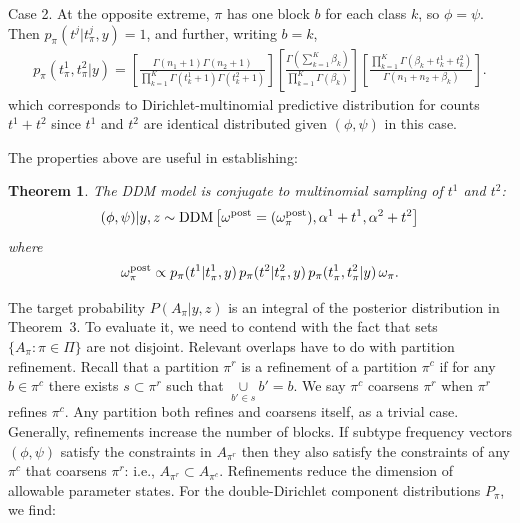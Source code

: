 \documentclass[aoas,preprint]{imsart}
\newtheorem{theorem}{Theorem}
\begin{document}
Case 2. At the opposite extreme, $\pi$  has one block $b$ for each
 class $k$, so $\phi=\psi$. Then $p_\pi(t^j | t^j_{\pi},y) = 1$, and 
further, writing $b = k$,
\begin{eqnarray*}
p_\pi(t^1_{\pi},t^2_{\pi}|y ) =
 \left[ \frac{ \Gamma(n_1+1) \Gamma(n_2+1) }{ \prod_{k=1}^K 
   \Gamma(t^1_k+1) 
   \Gamma( t^2_k + 1 )} \right] 
\left[ \frac{\Gamma( \sum_{k=1}^K \beta_k  )}{
   \prod_{k=1}^K \Gamma(\beta_k)} \right] 
 \left[ \frac{ \prod_{k=1}^K \Gamma( \beta_k + t^1_k + t^2_k )}{
	\Gamma( n_1 + n_2 + \beta_k  )} \right].
\end{eqnarray*}
which corresponds to Dirichlet-multinomial predictive distribution for counts $t^1 + t^2$ 
since $t^1$ and $t^2$ are identical distributed given $(\phi,\psi)$ in this case.


The properties above are useful in establishing:
\begin{theorem}
The DDM model is conjugate to multinomial sampling of $t^1$ and $t^2$:
\begin{eqnarray*}
(\phi,\psi)|y,z  \sim {\mbox {\rm DDM}}\left[ \omega^{\rm post}=(\omega^{\rm post}_\pi), \alpha^1 + t^1, \alpha^2 + t^2  \right]
\end{eqnarray*}
where
\begin{eqnarray}
\label{eq:postmix}
\omega^{\rm post}_\pi \propto 
 p_\pi(t^1 | t^1_{\pi},y)\, p_\pi(t^2|  t^2_{\pi},y )
 \, p_\pi( t^1_{\pi}, t^2_{\pi} | y ) \, \omega_\pi.
\end{eqnarray}

\end{theorem}


The target probability $P(A_\pi|y,z)$ is an integral of the posterior distribution in Theorem~3.
To evaluate it, we need to contend with the fact that sets $\{ A_\pi: \pi \in \Pi \}$ are not disjoint.
Relevant overlaps have to do with partition refinement.  Recall 
that a  partition $\pi^r$ is a refinement of a partition $\pi^c$ if for any $b \in \pi^c$ there 
exists $s \subset \pi^r$  such that $\underset{b'\in s}\cup b' = b$. 
We say $\pi^c$  coarsens $\pi^r$ when $\pi^r$ refines $\pi^c$. Any partition both
refines and coarsens itself, as a trivial case. 
Generally, refinements increase the number of blocks.
 If subtype frequency vectors $(\phi,\psi)$
satisfy the constraints in $A_{\pi^r}$ then they also satisfy the constraints of any $\pi^c$
that coarsens $\pi^r$: i.e., $A_{\pi^r} \subset A_{\pi^c}$.  
Refinements reduce the dimension of allowable parameter states. 
 For the double-Dirichlet
component distributions $P_\pi$, we find:
\end{document}
